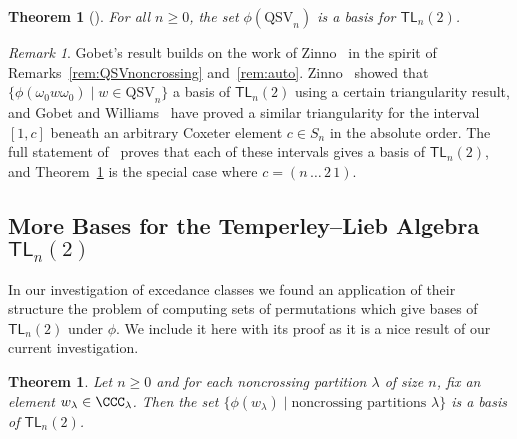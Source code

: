 \documentclass[12pt]{amsart}
\newtheorem{thm}[equation]{Theorem}
\theoremstyle{definition}
\theoremstyle{remark}
\newtheorem{rem}[equation]{Remark}
\numberwithin{equation}{section}
\newcommand{\TL}{\mathsf{TL}}
\newcommand{\QSV}{\mathrm{QSV}}
\begin{document}
\begin{thm}[{\cite[Theorem 7.21]{Gobet}}]
\label{thm:TLbasis}
For all $n \ge 0$, the set $\phi(\QSV_{n})$ is a basis for $\TL_{n}(2)$.
\end{thm}

\begin{rem}
Gobet's result builds on the work of Zinno~\cite{Zinno} in the spirit of Remarks~\ref{rem:QSVnoncrossing} and~\ref{rem:auto}. 
Zinno~\cite[Theorem 2]{Zinno} showed that $\{\phi(\omega_0w\omega_0) \;|\; w \in \QSV_{n}\}$ a basis of $\TL_{n}(2)$ using a certain triangularity result, and Gobet and Williams~\cite{GobetWilliams} have proved a similar triangularity for the interval $[1, c]$ beneath an arbitrary Coxeter element $c \in S_{n}$ in the absolute order.  
The full statement of~\cite[Theorem 7.21]{Gobet} proves that each of these intervals gives a basis of $\TL_{n}(2)$, and Theorem~\ref{thm:TLbasis} is the special case where $c = (n\,\ldots\,2\,1)$.
\end{rem}

\subsection{More Bases for the Temperley--Lieb Algebra $\TL_{n}(2)$}

In our investigation of excedance classes we found an application of their structure the problem of computing sets of permutations which give bases of $\TL_{n}(2)$ under $\phi$.  
We include it here with its proof as it is a nice result of our current investigation.

\begin{thm}
\label{thm:TLbases}
Let $n \ge 0$ and for each noncrossing partition $\lambda$ of size $n$, fix an element $w_{\lambda} \in \CCC_{\lambda}$. Then the set $\{\phi(w_{\lambda}) \;|\; \text{noncrossing partitions $\lambda$}\}$ is a basis of $\TL_{n}(2)$.
\end{thm}
\end{document}
